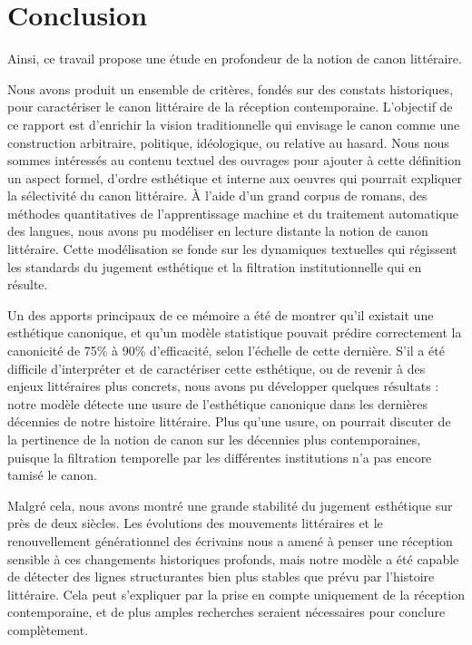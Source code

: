 \part*{Conclusion}

Ainsi, ce travail propose une étude en profondeur de la notion de canon littéraire.

Nous avons produit un ensemble de critères, fondés sur des constats historiques, pour caractériser le canon littéraire de la réception contemporaine. L'objectif de ce rapport est d'enrichir la vision traditionnelle qui envisage le  canon comme une construction arbitraire, politique, idéologique, ou relative au hasard. Nous nous sommes intéressés au contenu textuel des ouvrages pour ajouter à cette définition un aspect formel, d'ordre esthétique et interne aux oeuvres qui pourrait expliquer la sélectivité du canon littéraire. À l'aide d'un grand corpus de romans, des méthodes quantitatives de l'apprentissage machine et du traitement automatique des langues, nous avons pu modéliser en lecture distante la notion de canon littéraire. Cette modélisation se fonde sur les dynamiques textuelles qui régissent les standards du jugement esthétique et la filtration institutionnelle qui en résulte.

Un des apports principaux de ce mémoire a été de montrer qu'il existait une esthétique canonique, et qu'un modèle statistique pouvait prédire correctement la canonicité de 75\% à 90\% d'efficacité, selon l'échelle de cette dernière. S'il a été difficile d'interpréter et de caractériser cette esthétique, ou de revenir à des enjeux littéraires plus concrets, nous avons pu développer quelques résultats : notre modèle détecte une usure de l'esthétique canonique dans les dernières décennies de notre histoire littéraire. Plus qu'une usure, on pourrait discuter de la pertinence de la notion de canon sur les décennies plus contemporaines, puisque la filtration temporelle par les différentes institutions n'a pas encore tamisé le canon.  

Malgré cela, nous avons montré une grande stabilité du jugement esthétique sur près de deux siècles. Les évolutions des mouvements littéraires et le renouvellement générationnel des écrivains nous a amené à penser une réception sensible à ces changements historiques profonds, mais notre modèle a été capable de détecter des lignes structurantes bien plus stables que prévu par l'histoire littéraire. Cela peut s'expliquer par la prise en compte uniquement de la réception contemporaine, et de plus amples recherches seraient nécessaires pour conclure complètement.

